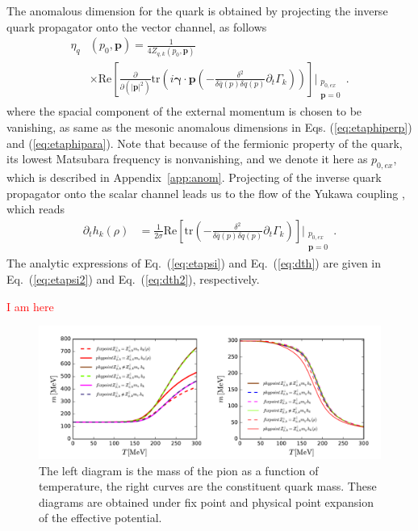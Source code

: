 \documentclass[%
reprint,
superscriptaddress,
showpacs,preprintnumbers,
 amsmath,amssymb,
 aps,
prd,
]{revtex4-1}
\def\Eq#1{Eq.~(\ref{#1})}
\def\app#1{Appendix~\ref{#1}}
\newcommand{\colwjf}[1]{\textcolor{red}{#1}}
\begin{document}
The anomalous dimension for the quark is obtained by projecting the inverse quark propagator onto the vector channel, as follows
\begin{align}
  \eta_{q}&(p_0,\bm{p})=\frac{1}{4 Z_{q,k}(p_0,\bm{p})}\nonumber \\[2ex]
          &\times\mathrm{Re}\left[\frac{\partial}{\partial (|\bm{p}|^2)}\mathrm{tr}
            \left(i \bm{\gamma}\cdot\bm{p}\left(-\frac{\delta^2}{\delta\bar{q}(p)
            \delta q(p)}\partial_t \Gamma_k\right)\right)\right]\Bigg|_{\substack{p_{0,ex}\\ \bm{p}=0}}\,.   \label{eq:etapsi}
\end{align}
where the spacial component of the external momentum is chosen to be vanishing, as same as the mesonic anomalous dimensions in Eqs. (\ref{eq:etaphiperp}) and (\ref{eq:etaphipara}). Note that because of the fermionic property of the quark, its lowest Matsubara frequency is nonvanishing, and we denote it here as $p_{0,ex}$, which is described in \app{app:anom}.  Projecting of the inverse quark propagator onto the scalar channel leads us to the flow of the Yukawa coupling \cite{Pawlowski:2014zaa}, which reads
\begin{align}
  \partial_t h_k(\rho)&=\frac{1}{2 \sigma}\mathrm{Re}\left[\mathrm{tr}\left(-\frac{\delta^2}{\delta\bar{q}(p)
            \delta q(p)}\partial_t \Gamma_k\right)\right]\Bigg|_{\substack{p_{0,ex}\\ \bm{p}=0}}\,.  \label{eq:dth}
\end{align}
The analytic expressions of \Eq{eq:etapsi} and \Eq{eq:dth} are given in \Eq{eq:etapsi2} and \Eq{eq:dth2}, respectively.











\colwjf{I am here}
















\begin{figure}[t]
\label{fig:m}
\includegraphics[width=1.0\textwidth]{m.pdf}
\caption{The left diagram is the mass of the pion as a function of temperature, the right curves are the constituent quark mass. 
These diagrams are obtained under fix point and physical point expansion of the effective potential.}
\end{figure}
\end{document}
